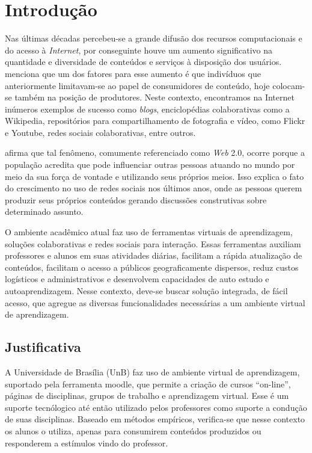 \chapter{Introdução}
\label{cap-introducao}

Nas últimas décadas percebeu-se a grande difusão dos recursos computacionais e do acesso à \textit{Internet}, por conseguinte houve um aumento significativo na quantidade e diversidade de conteúdos e serviços à disposição dos usuários.  menciona que um dos fatores para esse aumento é que indivíduos que anteriormente limitavam-se ao papel de consumidores de conteúdo, hoje colocam-se também na posição de produtores. Neste contexto, encontramos na Internet inúmeros exemplos de sucesso como \textit{blogs}, enciclopédias colaborativas como a Wikipedia, repositórios para compartilhamento de fotografia e vídeo, como Flickr e Youtube, redes sociais colaborativas, entre outros.

 afirma que tal fenômeno, comumente referenciado como \textit{Web} 2.0, ocorre porque a população acredita que pode influenciar outras pessoas atuando no mundo por meio da sua força de vontade e utilizando seus próprios meios. Isso explica o fato do crescimento no uso de redes sociais nos últimos anos, onde as pessoas querem produzir seus próprios conteúdos gerando discussões construtivas sobre determinado assunto.


O ambiente acadêmico atual faz uso de ferramentas virtuais de aprendizagem, soluções colaborativas e redes sociais para interação. Essas ferramentas auxiliam professores e alunos em suas atividades diárias, facilitam a rápida atualização de conteúdos, facilitam o acesso a públicos geograficamente dispersos, reduz custos logísticos e administrativos e desenvolvem capacidades de auto estudo e autoaprendizagem. Nesse contexto, deve-se buscar solução integrada, de fácil acesso, que agregue  as diversas funcionalidades necessárias a um ambiente virtual de aprendizagem.

\section{Justificativa}

A Universidade de Brasília (UnB) faz uso de ambiente virtual de aprendizagem, suportado pela ferramenta moodle, que permite a criação de cursos ``on-line'', páginas de disciplinas, grupos de trabalho e aprendizagem virtual. Esse é um suporte tecnólogico até então utilizado pelos professores como suporte a condução de suas disciplinas. Baseado em métodos empíricos, verifica-se que nesse contexto os alunos o utiliza, apenas para consumirem conteúdos produzidos ou responderem a estímulos vindo do professor.

